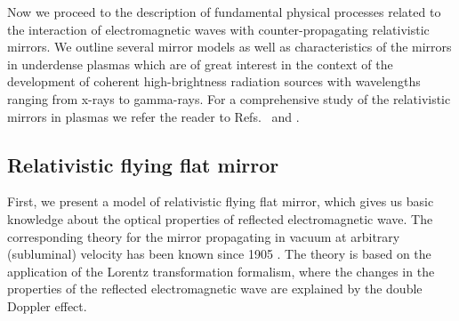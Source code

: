 \documentclass[10pt, a4paper, twoside, openright]{report}
\begin{document}
%

%

%

%

Now we proceed to the description of fundamental physical processes related to the interaction of electromagnetic waves with counter-propagating relativistic mirrors. We outline several mirror models as well as characteristics of the mirrors in underdense plasmas which are of great interest in the context of the development of coherent high-brightness radiation sources with wavelengths ranging from x-rays to gamma-rays. For a comprehensive study of the relativistic mirrors in plasmas we refer the reader to Refs.~ and .


\subsection{Relativistic flying flat mirror\label{sec:rffm}}


First, we present a model of relativistic flying flat mirror, which gives us basic knowledge about the optical properties of reflected electromagnetic wave. The corresponding theory for the mirror propagating in vacuum at arbitrary (subluminal) velocity has been known since 1905 \cite{Einstein1905}. The theory is based on the application of the Lorentz transformation formalism, where the changes in the properties of the reflected electromagnetic wave are explained by the double Doppler effect.
\end{document}
